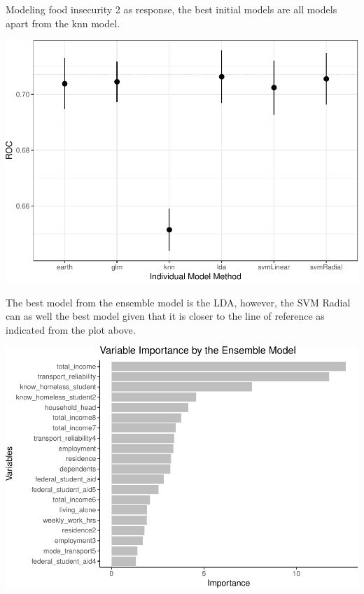 \documentclass[
  10pt,
]{article}
\begin{document}
\hfill\break
Modeling food insecurity 2 as response, the best initial models are all models apart from the knn model.\\

\begin{center}\includegraphics{phase2_report_files/figure-latex/unnamed-chunk-22-1} \end{center}

\hfill\break
The best model from the ensemble model is the LDA, however, the SVM Radial can as well the best model given that it is closer to the line of reference as indicated from the plot above.\\

\begin{center}\includegraphics{phase2_report_files/figure-latex/unnamed-chunk-23-1} \end{center}
\end{document}
